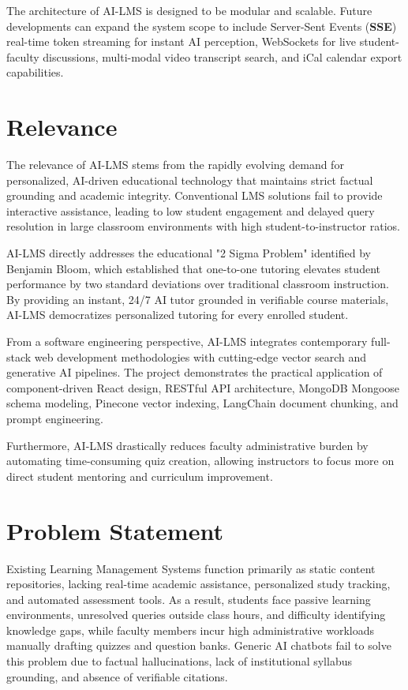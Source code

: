 The architecture of AI-LMS is designed to be modular and scalable. Future developments can expand the system scope to include Server-Sent Events (\textbf{SSE}) real-time token streaming for instant AI perception, WebSockets for live student-faculty discussions, multi-modal video transcript search, and iCal calendar export capabilities.

\section{Relevance}

The relevance of AI-LMS stems from the rapidly evolving demand for personalized, AI-driven educational technology that maintains strict factual grounding and academic integrity. Conventional LMS solutions fail to provide interactive assistance, leading to low student engagement and delayed query resolution in large classroom environments with high student-to-instructor ratios.

AI-LMS directly addresses the educational "2 Sigma Problem" identified by Benjamin Bloom, which established that one-to-one tutoring elevates student performance by two standard deviations over traditional classroom instruction. By providing an instant, 24/7 AI tutor grounded in verifiable course materials, AI-LMS democratizes personalized tutoring for every enrolled student.

From a software engineering perspective, AI-LMS integrates contemporary full-stack web development methodologies with cutting-edge vector search and generative AI pipelines. The project demonstrates the practical application of component-driven React design, RESTful API architecture, MongoDB Mongoose schema modeling, Pinecone vector indexing, LangChain document chunking, and prompt engineering.

Furthermore, AI-LMS drastically reduces faculty administrative burden by automating time-consuming quiz creation, allowing instructors to focus more on direct student mentoring and curriculum improvement.

\section{Problem Statement}

Existing Learning Management Systems function primarily as static content repositories, lacking real-time academic assistance, personalized study tracking, and automated assessment tools. As a result, students face passive learning environments, unresolved queries outside class hours, and difficulty identifying knowledge gaps, while faculty members incur high administrative workloads manually drafting quizzes and question banks. Generic AI chatbots fail to solve this problem due to factual hallucinations, lack of institutional syllabus grounding, and absence of verifiable citations.

